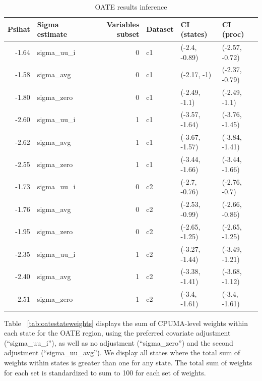 \documentclass[12pt]{article}
\begin{document}
\begin{table}[ht]
\begin{tabular}{rlrlll}
  \toprule
Psihat & Sigma estimate & Variables subset & Dataset & CI (states) & CI (proc) \\ 
  \midrule
-1.64 & sigma\_uu\_i & 0 & c1 & (-2.4, -0.89) & (-2.57, -0.72) \\ 
  -1.58 & sigma\_avg & 0 & c1 & (-2.17, -1) & (-2.37, -0.79) \\ 
  -1.80 & sigma\_zero & 0 & c1 & (-2.49, -1.1) & (-2.49, -1.1) \\ 
  -2.60 & sigma\_uu\_i & 1 & c1 & (-3.57, -1.64) & (-3.76, -1.45) \\ 
  -2.62 & sigma\_avg & 1 & c1 & (-3.67, -1.57) & (-3.84, -1.41) \\ 
  -2.55 & sigma\_zero & 1 & c1 & (-3.44, -1.66) & (-3.44, -1.66) \\ 
  -1.73 & sigma\_uu\_i & 0 & c2 & (-2.7, -0.76) & (-2.76, -0.7) \\ 
  -1.76 & sigma\_avg & 0 & c2 & (-2.53, -0.99) & (-2.66, -0.86) \\ 
  -1.95 & sigma\_zero & 0 & c2 & (-2.65, -1.25) & (-2.65, -1.25) \\ 
  -2.35 & sigma\_uu\_i & 1 & c2 & (-3.27, -1.44) & (-3.49, -1.21) \\ 
  -2.40 & sigma\_avg & 1 & c2 & (-3.38, -1.41) & (-3.68, -1.12) \\ 
  -2.51 & sigma\_zero & 1 & c2 & (-3.4, -1.61) & (-3.4, -1.61) \\ 
   \bottomrule
\end{tabular}
\caption{OATE results inference}
\label{tab:oateconfint}
\end{table}

Table ~\ref{tab:oatestateweights} displays the sum of CPUMA-level weights within each state for the OATE region, using the preferred covariate adjustment (``sigma\_uu\_i''), as well as no adjustment (``sigma\_zero'') and the second adjustment (``sigma\_uu\_avg''). We display all states where the total sum of weights within states is greater than one for any state. The total sum of weights for each set is standardized to sum to 100 for each set of weights.
\end{document}
